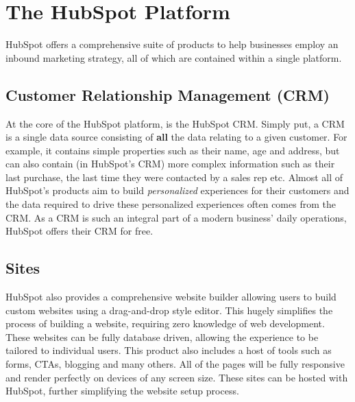 \section{The HubSpot Platform}
HubSpot offers a comprehensive suite of products to help businesses employ an inbound marketing strategy, all of which are contained within a single platform.

\subsection{Customer Relationship Management (CRM)}
At the core of the HubSpot platform, is the HubSpot CRM. Simply put, a CRM is a single data source consisting of \textbf{all} the data relating to a given customer. For example, it contains simple properties such as their name, age and address, but can also contain (in HubSpot's CRM) more complex information such as their last purchase, the last time they were contacted by a sales rep etc. Almost all of HubSpot's products aim to build \textit{personalized} experiences for their customers and the data required to drive these personalized experiences often comes from the CRM. As a CRM is such an integral part of a modern business' daily operations, HubSpot offers their CRM for free. 

\subsection{Sites}
HubSpot also provides a comprehensive website builder allowing users to build custom websites using a drag-and-drop style editor. This hugely simplifies the process of building a website, requiring zero knowledge of web development. These websites can be fully database driven, allowing the experience to be tailored to individual users. This product also includes a host of tools such as forms, CTAs, blogging and many others. All of the pages will be fully responsive and render perfectly on devices of any screen size. These sites can be hosted with HubSpot, further simplifying the website setup process.

